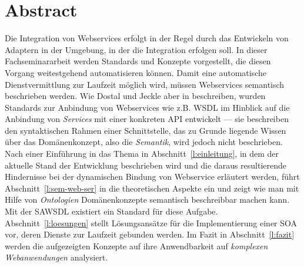 \section*{Abstract}

Die Integration von Webservices erfolgt in der Regel durch das Entwickeln von Adaptern in der Umgebung, in der die Integration erfolgen soll. In dieser Fachseminararbeit werden Standards und Konzepte vorgestellt, die diesen Vorgang weitestgehend automatisieren können. Damit eine automatische Dienstvermittlung zur Laufzeit möglich wird, müssen Webservices semantisch beschrieben werden. Wie Dostal und Jeckle aber in \cite[S.55]{xmlspek1} beschreiben, wurden Standards zur Anbindung von Webservices wie z.B. \acs{WSDL} im Hinblick auf die Anbindung von \emph{Services} mit einer konkreten API entwickelt --- sie beschreiben den syntaktischen Rahmen einer Schnittstelle, das zu Grunde liegende Wissen über das Domänenkonzept, also die \emph{Semantik}, wird jedoch nicht beschrieben. Nach einer Einführung in das Thema in Abschnitt~\ref{l:einleitung}, in dem der aktuelle Stand der Entwicklung beschrieben wird und die daraus resultierende Hindernisse bei der dynamischen Bindung von Webservice erläutert werden, führt Abschnitt~\ref{l:sem-web-ser} in die theoretischen Aspekte ein und zeigt wie man mit Hilfe von \emph{Ontologien} Domänenkonzepte semantisch beschreibbar machen kann. Mit der \acs{SAWSDL} existiert ein Standard für diese Aufgabe. Abschnitt~\ref{l:loesungen} stellt Lösungsansätze für die Implementierung einer \acs{SOA} vor, deren Dienste zur Laufzeit gebunden werden. Im Fazit in Abschnitt~\ref{l:fazit} werden die aufgezeigten Konzepte auf ihre Anwendbarkeit auf \emph{komplexen Webanwendungen} analysiert.
